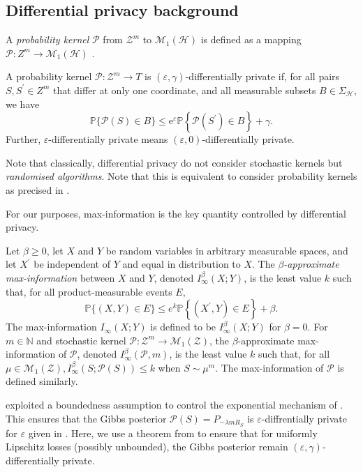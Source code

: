 \begin{noaddcontents}
\subsection{Differential privacy background}
\label{sec: back_dp}
\begin{definition}
A \emph{probability kernel} $\mathcal{P}$ from $\mathcal{Z}^m$ to $\mathcal{M}_1(\mathcal{H})$ is defined as a mapping $\mathcal{P}: {Z}^m \rightarrow \mathcal{M}_1(\mathcal{H})$ .
\end{definition}

\begin{definition}
A probability kernel $\mathcal{P}: \mathcal{Z}^m \rightarrow T$ is $(\varepsilon, \gamma)$-differentially private if, for all pairs $S, S^{\prime} \in Z^m$ that differ at only one coordinate, and all measurable subsets $B \in \Sigma_{\mathcal{H}}$, we have $$\mathbb{P}\{\mathcal{P}(S) \in B\} \leq \mathrm{e}^{\varepsilon} \mathbb{P}\left\{\mathcal{P}\left(S^{\prime}\right) \in B\right\}+\gamma.$$
Further, $\varepsilon$-differentially private means $(\varepsilon, 0)$-differentially private.
\end{definition}

\begin{remark}
Note that classically, differential privacy do not consider stochastic kernels but \emph{randomised algorithms}. Note that this is equivalent to consider probability kernels as precised in \citet[footnote 3, Appendix A]{dziugaite2018data}.
\end{remark}
For our purposes, max-information is the key quantity controlled by differential privacy.
\begin{definition}
Let $\beta \geq 0$, let $X$ and $Y$ be random variables in arbitrary measurable spaces, and let $X^{\prime}$ be independent of $Y$ and equal in distribution to $X$. The \emph{$\beta$-approximate max-information} between $X$ and $Y$, denoted $I_{\infty}^\beta(X ; Y)$, is the least value $k$ such that, for all product-measurable events $E$,
$$
\mathbb{P}\{(X, Y) \in E\} \leq e^k \mathbb{P}\left\{\left(X^{\prime}, Y\right) \in E\right\}+\beta .
$$
The max-information $I_{\infty}(X ; Y)$ is defined to be $I_{\infty}^\beta(X ; Y)$ for $\beta=0$.
For $m \in \mathbb{N}$ and stochastic kernel $\mathcal{P}: \mathcal{Z}^m \rightarrow \mathcal{M}_1(\mathcal{Z})$, the $\beta$-approximate max-information of $\mathcal{P}$, denoted $I_{\infty}^\beta(\mathcal{P}, m)$, is the least value $k$ such that, for all $\mu \in \mathcal{M}_1(\mathcal{Z}), I_{\infty}^\beta(S ; \mathcal{P}(S)) \leq k$
when $S \sim \mathcal{\mu}^m$. The max-information of $\mathcal{P}$ is defined similarly.
\end{definition}
\citet{dziugaite2018data} exploited a boundedness assumption to control the exponential mechanism of \citet{mcsherry2007mechanism}. This ensures that the Gibbs posterior $\mathcal{P}(S)= P_{-\lambda m R_S}$ is $\varepsilon$-diffrentially private for $\varepsilon$ given in \citet[Corollary 5.2]{dziugaite2018data}.
Here, we use a theorem from \citet{minami2016diff} to ensure that for uniformly Lipschitz losses (possibly unbounded), the Gibbs posterior remain $(\varepsilon, \gamma)$-differentially private.


\end{noaddcontents}
